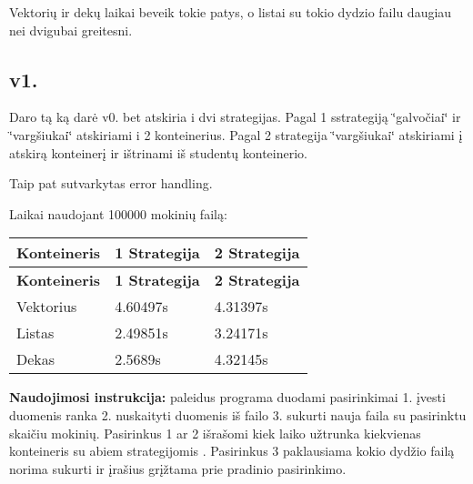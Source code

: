 Vektorių ir dekų laikai beveik tokie patys, o listai su tokio dydzio failu daugiau nei dvigubai greitesni.

\subsection*{v1.}

Daro tą ką darė v0. bet atskiria i dvi strategijas. Pagal 1 sstrategiją \char`\"{}galvočiai\char`\"{} ir \char`\"{}vargšiukai\char`\"{} atskiriami i 2 konteinerius. Pagal 2 strategija \char`\"{}vargšiukai\char`\"{} atskiriami į atskirą konteinerį ir ištrinami iš studentų konteinerio.

Taip pat sutvarkytas error handling.

Laikai naudojant 100000 mokinių failą\+:

\tabulinesep=1mm
\begin{longtabu} spread 0pt [c]{*{3}{|X[-1]}|}
\hline
\rowcolor{\tableheadbgcolor}\textbf{ Konteineris  }&\textbf{ 1 Strategija  }&\textbf{ 2 Strategija   }\\
\endfirsthead
\hline
\endfoot
\hline
\rowcolor{\tableheadbgcolor}\textbf{ Konteineris  }&\textbf{ 1 Strategija  }&\textbf{ 2 Strategija   }\\
\endhead
Vektorius  &4.\+60497s  &4.\+31397s   \\
Listas  &2.\+49851s  &3.\+24171s   \\
Dekas  &2.\+5689s  &4.\+32145s   \\
\end{longtabu}


{\bfseries Naudojimosi instrukcija\+:} paleidus programa duodami pasirinkimai 1. įvesti duomenis ranka 2. nuskaityti duomenis iš failo 3. sukurti nauja faila su pasirinktu skaičiu mokinių. Pasirinkus 1 ar 2 išrašomi kiek laiko užtrunka kiekvienas konteineris su abiem strategijomis . Pasirinkus 3 paklausiama kokio dydžio failą norima sukurti ir įrašius grįžtama prie pradinio pasirinkimo. 